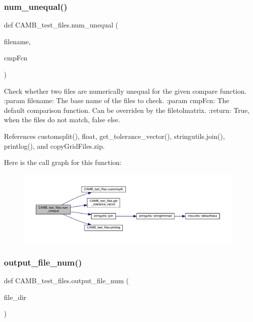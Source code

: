 \subsubsection{\texorpdfstring{num\+\_\+unequal()}{num\_unequal()}}
{\footnotesize\ttfamily def C\+A\+M\+B\+\_\+test\+\_\+files.\+num\+\_\+unequal (\begin{DoxyParamCaption}\item[{}]{filename,  }\item[{}]{cmp\+Fcn }\end{DoxyParamCaption})}

\begin{DoxyVerb}Check whether two files are numerically unequal for the given compare function.
:param filename: The base name of the files to check.
:param cmpFcn: The default comparison function. Can be overriden by the filetolmatrix.
:return: True, when the files do not match, false else.
\end{DoxyVerb}
 

References customsplit(), float, get\+\_\+tolerance\+\_\+vector(), stringutils.\+join(), printlog(), and copy\+Grid\+Files.\+zip.

Here is the call graph for this function\+:
\nopagebreak
\begin{figure}[H]
\begin{center}
\leavevmode
\includegraphics[width=350pt]{namespaceCAMB__test__files_a79f9b0e8484d9f397e2dc4addc178620_cgraph}
\end{center}
\end{figure}
\mbox{\label{namespaceCAMB__test__files_a2aa5d4f5677cf5a78388238c4dc45b7d}} 
\subsubsection{\texorpdfstring{output\+\_\+file\+\_\+num()}{output\_file\_num()}}
{\footnotesize\ttfamily def C\+A\+M\+B\+\_\+test\+\_\+files.\+output\+\_\+file\+\_\+num (\begin{DoxyParamCaption}\item[{}]{file\+\_\+dir }\end{DoxyParamCaption})}



